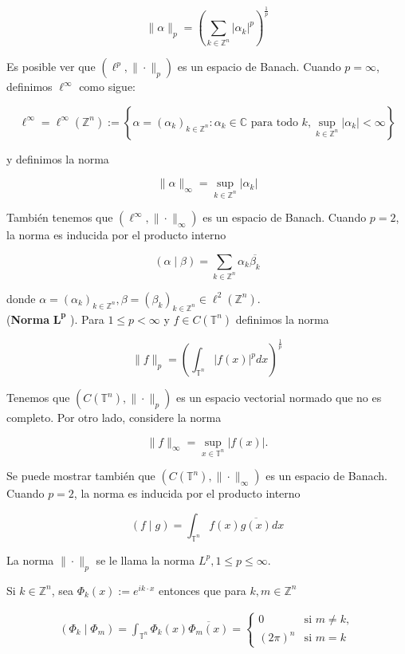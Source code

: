 \documentclass[12pt]{article}
\newcommand\Z{\ensuremath{\mathbb{Z}}}
\newcommand\T{\mathbb{T}}
\begin{document}
$$
\|\alpha\|_p=\left(\sum_{k\in \Z^n}\left|\alpha_k\right|^p\right)^{\frac{1}{p}}
$$


Es posible ver que $\left(\ell^p,\|\cdot\|_p\right)$ es un espacio de Banach. Cuando $p=\infty$, definimos $\ell^{\infty}$ como sigue:

$$
\ell^{\infty}=\ell^{\infty}(\mathbb{Z}^n):=\left\{\alpha=\left(\alpha_k\right)_{k \in \mathbb{Z}^n}: \alpha_k \in \mathbb{C} \text { para todo } k, \sup _{k \in \mathbb{Z}^n}\left|\alpha_k\right|<\infty\right\}
$$

y definimos la norma

$$
\|\alpha\|_{\infty}=\sup _{k \in \mathbb{Z}^n}\left|\alpha_k\right|
$$


También tenemos que $\left(\ell^{\infty},\|\cdot\|_{\infty}\right)$ es un espacio de Banach.
Cuando $p=2$, la norma es inducida por el producto interno

$$
(\alpha \mid \beta)=\sum_{k\in \Z^n} \alpha_k \overline{\beta_k}
$$

donde $\alpha=\left(\alpha_k\right)_{k \in \mathbb{Z}^n}, \beta=\left(\beta_k\right)_{k \in \mathbb{Z}^n} \in \ell^2(\mathbb{Z}^n)$.\\



(\textbf{Norma} $\mathbf{L^p}$ ). Para $1 \leq p<\infty$ y $f \in C(\T^n)$ definimos la norma

$$
\|f\|_p=\left(\int_{\T^n}|f(x)|^p d x\right)^{\frac{1}{p}}
$$


Tenemos que $\left(C(\T^n),\|\cdot\|_p\right)$ es un espacio vectorial normado que no es completo.
Por otro lado, considere la norma

$$
\|f\|_{\infty}=\sup _{x \in \T^n}|f(x)| .
$$


Se puede mostrar también que $\left(C(\T^n),\|\cdot\|_{\infty}\right)$ es un espacio de Banach.
Cuando $p=2$, la norma es inducida por el producto interno

$$
(f \mid g)=\int_{\T^n} f(x) \overline{g(x)} d x
$$


La norma $\|\cdot\|_p$ se le llama la norma $L^p, 1 \leq p \leq \infty$.


\begin{theorem}\label{ortogonalidad}
Si $k \in \mathbb{Z}^n$, sea $\Phi_k(x):=e^{i k \cdot x}$ entonces que para $k, m \in \mathbb{Z}^n$

$$
\begin{array}{ll}
\displaystyle\left(\Phi_k \mid \Phi_m\right)=\int_{\T^n} \Phi_k(x) \overline{\Phi_m(x)}=\begin{cases}
0 \quad &\text{si }m\neq  k,\\
(2\pi)^n &\text{si } m=k
\end{cases}
\end{array}
$$
\end{theorem}
\end{document}
